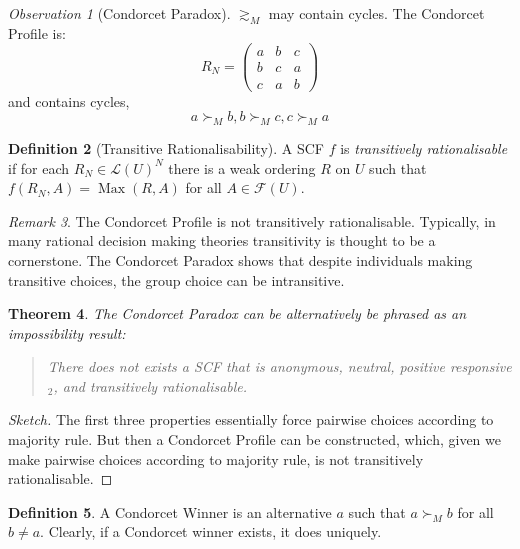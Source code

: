 \documentclass{book}
\theoremstyle{plain}
\newtheorem{theorem}{Theorem}[subsection]
\theoremstyle{definition}
\newtheorem{definition}[theorem]{Definition}
\theoremstyle{remark}
\newtheorem{remark}[theorem]{Remark}
\newtheorem{observation}[theorem]{Observation}
\begin{document}
\begin{observation}[Condorcet Paradox]
    $\gtrsim_M$ may contain cycles.
    The Condorcet Profile is:
    \[
        R_N = \begin{pmatrix}
        a & b & c \\
        b & c & a \\
        c & a & b
        \end{pmatrix}
    \]
    and contains cycles,
    \[
        a \succ_M b, b \succ_M c, c \succ_M a
    \]
\end{observation}

\begin{definition}[Transitive Rationalisability]
    A SCF $f$ is 
    \emph{transitively rationalisable}
    if for 
    each $R_N \in \mathcal{L}(U)^N$ 
    there is a weak ordering $R$ on $U$ such that
    $f(R_N, A) = \operatorname{Max}(R, A)$ for all $A \in \mathcal{F}(U)$.
\end{definition}

\begin{remark}
    The Condorcet Profile
    is not transitively rationalisable.
    Typically, in many rational 
    decision making theories
    transitivity is thought to be a cornerstone.
    The Condorcet Paradox shows that
    despite individuals making 
    transitive choices,
    the group choice can be intransitive.
\end{remark}

\begin{theorem}
    The Condorcet Paradox 
    can be alternatively be phrased as an impossibility
    result:
    \begin{quote}
        There does not exists a 
        SCF that is anonymous, neutral, 
        positive responsive$_2$,
        and transitively rationalisable.
    \end{quote}
\end{theorem}
\begin{proof}[Sketch]
    The first three 
    properties essentially force 
    pairwise choices according to 
    majority rule. But then a 
    Condorcet Profile can 
    be constructed, which, 
    given 
    we make pairwise choices according to 
    majority rule,
    is not transitively rationalisable.
\end{proof}

\begin{definition}
    A Condorcet Winner 
    is an alternative $a$ such that $a \succ_M b$ for all $b \neq a$.
    Clearly, if a Condorcet winner exists, it does uniquely.
\end{definition}
\end{document}
